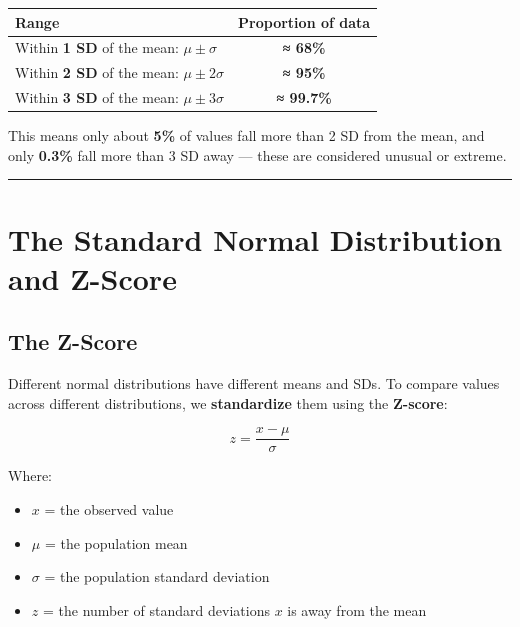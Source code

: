 \documentclass[
  12pt,
  letterpaper,
]{book}
\newcounter{none} %
\providecommand{\tightlist}{%
  \setlength{\itemsep}{0pt}\setlength{\parskip}{0pt}}
\begin{document}
\begin{tcolorbox}[enhanced jigsaw, arc=.35mm, bottomrule=.15mm, bottomtitle=1mm, breakable, colback=white, colbacktitle=quarto-callout-important-color!10!white, colframe=quarto-callout-important-color-frame, coltitle=black, left=2mm, leftrule=.75mm, opacityback=0, opacitybacktitle=0.6, rightrule=.15mm, title={📐 The Empirical Rule}, titlerule=0mm, toprule=.15mm, toptitle=1mm]

{\def\LTcaptype{none} %
\begin{longtable}[]{@{}lc@{}}
\toprule\noalign{}
Range & Proportion of data \\
\midrule\noalign{}
\endhead
\bottomrule\noalign{}
\endlastfoot
Within \textbf{1 SD} of the mean: \(\mu \pm \sigma\) & \textbf{≈
68\%} \\
Within \textbf{2 SD} of the mean: \(\mu \pm 2\sigma\) & \textbf{≈
95\%} \\
Within \textbf{3 SD} of the mean: \(\mu \pm 3\sigma\) & \textbf{≈
99.7\%} \\
\end{longtable}
}

This means only about \textbf{5\%} of values fall more than 2 SD from
the mean, and only \textbf{0.3\%} fall more than 3 SD away --- these are
considered unusual or extreme.

\end{tcolorbox}

\begin{center}\rule{0.5\linewidth}{0.5pt}\end{center}

\section{The Standard Normal Distribution and
Z-Score}\label{the-standard-normal-distribution-and-z-score}

\subsection{The Z-Score}\label{the-z-score}

Different normal distributions have different means and SDs. To compare
values across different distributions, we \textbf{standardize} them
using the \textbf{Z-score}:

\[z = \frac{x - \mu}{\sigma}\]

Where:

\begin{itemize}
\tightlist
\item
  \(x\) = the observed value
\item
  \(\mu\) = the population mean
\item
  \(\sigma\) = the population standard deviation
\item
  \(z\) = the number of standard deviations \(x\) is away from the mean
\end{itemize}
\end{document}

